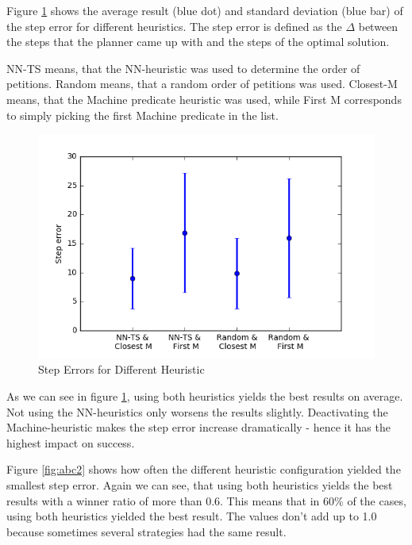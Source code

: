 Figure \ref{fig:abc1} shows the average result (blue dot) and standard deviation (blue bar) of the step error for different heuristics. The step error is defined as the $\Delta$ between the steps that the planner came up with and the steps of the optimal solution.

NN-TS means, that the NN-heuristic was used to determine the order of petitions. Random means, that a random order of petitions was used. Closest-M means, that the Machine predicate heuristic was used, while First M corresponds to simply picking the first Machine predicate in the list.


\begin{figure}[!hbt]
  \includegraphics[width=1\textwidth]{img/step_error_vs_heuristic}
  \caption{Step Errors for Different Heuristic}
  \label{fig:abc1}
\end{figure}

As we can see in figure \ref{fig:abc1}, using both heuristics yields the best results on average. Not using the NN-heuristics only worsens the results slightly. Deactivating the Machine-heuristic makes the step error increase dramatically - hence it has the highest impact on success.

Figure \ref{fig:abc2} shows how often the different heuristic configuration yielded the smallest step error. Again we can see, that using both heuristics yields the best results with a winner ratio of more than 0.6. This means that in 60\% of the cases, using both heuristics yielded the best result. The values don't add up to 1.0 because sometimes several strategies had the same result.

